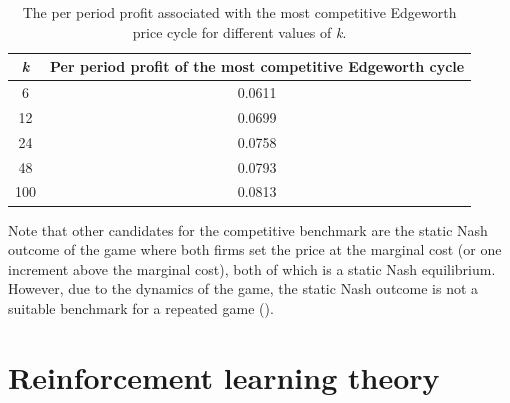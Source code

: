 \documentclass{article}
\begin{document}
\begin{table}[H]
    \centering
    \begin{tabular}{|c|c|}
        \hline
       \textit{k} & Per period profit of the 
 most competitive Edgeworth cycle \\
        \hline
        6 & 0.0611 \\
        \hline
        12 & 0.0699 \\
        \hline 
        24 & 0.0758 \\
        \hline
        48 & 0.0793 \\
        \hline
        100 & 0.0813 \\
        \hline
    \end{tabular}
    \caption{The per period profit associated with the most competitive Edgeworth price cycle for different values of \textit{k}.}
    \label{tab:kPrPeriodProf}
\end{table}

Note that other candidates for the competitive benchmark are the static Nash outcome of the game where both firms set the price at the marginal cost (or one increment above the marginal cost), both of which is a static Nash equilibrium. However, due to the dynamics of the game, the static Nash outcome is not a suitable benchmark for a repeated game (\cite{Klein2021}).

\section{Reinforcement learning theory} \label{ReinforcementLearningTheory}
\end{document}
